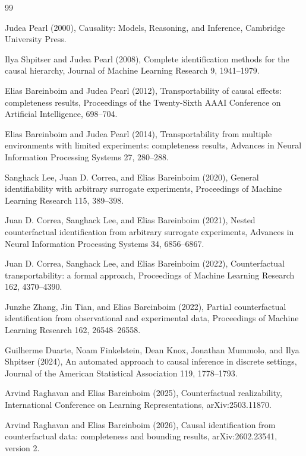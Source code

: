 \documentclass{article}
\begin{document}
\begin{thebibliography}{99}

   Judea Pearl (2000), Causality: Models, Reasoning, and Inference, Cambridge University Press.

   Ilya Shpitser and Judea Pearl (2008), Complete identification methods for the causal hierarchy, Journal of Machine Learning Research 9, 1941--1979.

   Elias Bareinboim and Judea Pearl (2012), Transportability of causal effects: completeness results, Proceedings of the Twenty-Sixth AAAI Conference on Artificial Intelligence, 698--704.

   Elias Bareinboim and Judea Pearl (2014), Transportability from multiple environments with limited experiments: completeness results, Advances in Neural Information Processing Systems 27, 280--288.

   Sanghack Lee, Juan D. Correa, and Elias Bareinboim (2020), General identifiability with arbitrary surrogate experiments, Proceedings of Machine Learning Research 115, 389--398.

   Juan D. Correa, Sanghack Lee, and Elias Bareinboim (2021), Nested counterfactual identification from arbitrary surrogate experiments, Advances in Neural Information Processing Systems 34, 6856--6867.

   Juan D. Correa, Sanghack Lee, and Elias Bareinboim (2022), Counterfactual transportability: a formal approach, Proceedings of Machine Learning Research 162, 4370--4390.

   Junzhe Zhang, Jin Tian, and Elias Bareinboim (2022), Partial counterfactual identification from observational and experimental data, Proceedings of Machine Learning Research 162, 26548--26558.

   Guilherme Duarte, Noam Finkelstein, Dean Knox, Jonathan Mummolo, and Ilya Shpitser (2024), An automated approach to causal inference in discrete settings, Journal of the American Statistical Association 119, 1778--1793.

   Arvind Raghavan and Elias Bareinboim (2025), Counterfactual realizability, International Conference on Learning Representations, arXiv:2503.11870.

   Arvind Raghavan and Elias Bareinboim (2026), Causal identification from counterfactual data: completeness and bounding results, arXiv:2602.23541, version 2.


\end{thebibliography}
\end{document}
